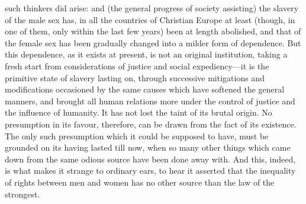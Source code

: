 \documentclass[12pt]{report}
\begin{document}
such thinkers did arise: and (the general progress of society assisting) the slavery of the male sex has, in all the countries of Christian Europe at least (though, in one of them, only within the last few years) been at length abolished, and that of the female sex has been gradually changed into a milder form of dependence. But this dependence, as it exists at present, is not an original institution, taking a fresh start from considerations of justice and social expediency—it is the primitive state of slavery lasting on, through successive mitigations and modifications occasioned by the same causes which have softened the general manners, and brought all human relations more under the control of justice and the influence of humanity. It has not lost the taint of its brutal origin. No presumption in its favour, therefore, can be drawn from the fact of its existence. The only such presumption which it could be supposed to have, must be grounded on its having lasted till now, when so many other things which came down from the same odious source have been done away with. And this, indeed, is what makes it strange to ordinary ears, to hear it asserted that the inequality of rights between men and women has no other source than the law of the strongest.
\end{document}
